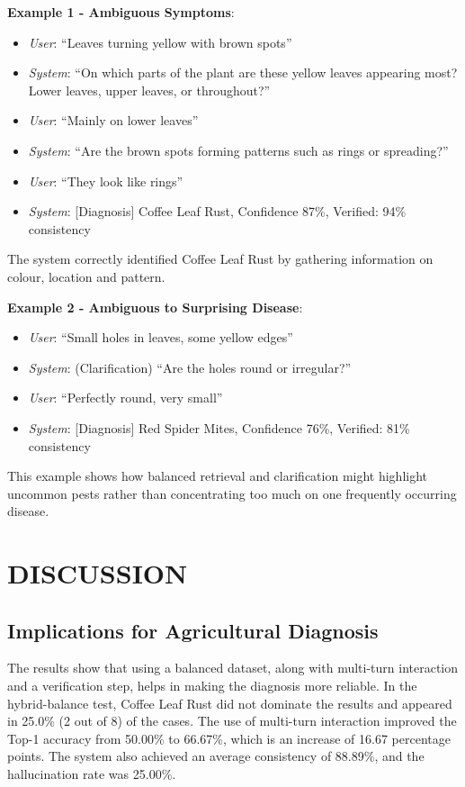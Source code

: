 \documentclass[conference]{IEEEtran}
\begin{document}
\textbf{Example 1 - Ambiguous Symptoms}:
\begin{itemize}
    \item \textit{User}:  ``Leaves turning yellow with brown spots''
    \item \textit{System}: ``On which parts of the plant are these yellow leaves appearing most? Lower leaves, upper leaves, or throughout?''
    \item \textit{User}: ``Mainly on lower leaves''
    \item \textit{System}: ``Are the brown spots forming patterns such as rings or spreading?''
    \item \textit{User}: ``They look like rings''
    \item \textit{System}: [Diagnosis] Coffee Leaf Rust, Confidence 87\%, Verified: 94\% consistency
\end{itemize}

The system correctly identified Coffee Leaf Rust by gathering information on colour, location and pattern.

\textbf{Example 2 - Ambiguous to Surprising Disease}:
\begin{itemize}
    \item \textit{User}: ``Small holes in leaves, some yellow edges''
    \item \textit{System}: (Clarification) ``Are the holes round or irregular?''
    \item \textit{User}: ``Perfectly round, very small''
    \item \textit{System}: [Diagnosis] Red Spider Mites, Confidence 76\%, Verified: 81\% consistency
\end{itemize}

This example shows how balanced retrieval and clarification might highlight uncommon pests rather than concentrating too much on one frequently occurring disease.

\section{DISCUSSION}

\subsection{Implications for Agricultural Diagnosis}

The results show that using a balanced dataset, along with multi-turn interaction and a verification step, helps in making the diagnosis more reliable. In the hybrid-balance test, Coffee Leaf Rust did not dominate the results and appeared in 25.0\% (2 out of 8) of the cases. The use of multi-turn interaction improved the Top-1 accuracy from 50.00\% to 66.67\%, which is an increase of 16.67 percentage points. The system also achieved an average consistency of 88.89\%, and the hallucination rate was 25.00\%.
\end{document}
